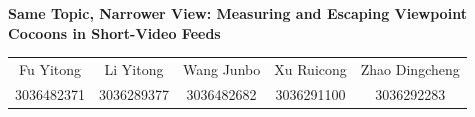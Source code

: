 \documentclass[10pt,a4paper]{article}
\begin{document}
\thispagestyle{firstpage}

\vspace*{0.12cm}
{\centering\parbox{0.85\textwidth}{\centering\Large\bfseries
  Same Topic, Narrower View: Measuring and Escaping Viewpoint Cocoons in Short-Video Feeds\par}\par}
\vspace{0.32cm}
{\centering\setlength{\tabcolsep}{0.9em}\renewcommand{\arraystretch}{1.05}%
  \begin{tabular}{ccccc}
    Fu Yitong & Li Yitong & Wang Junbo & Xu Ruicong & Zhao Dingcheng\\
    {\small\color{mute}3036482371} & {\small\color{mute}3036289377} & {\small\color{mute}3036482682} &
    {\small\color{mute}3036291100} & {\small\color{mute}3036292283}
  \end{tabular}\par}
\vspace{0.10in}











\clearpage
{\footnotesize\setlength{\bibsep}{2.5pt plus 1pt}


}

\clearpage
\appendix


\end{document}
